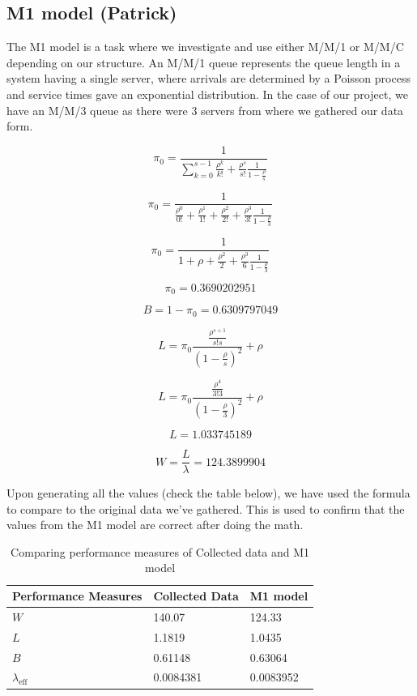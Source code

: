 \documentclass{article}
\begin{document}
\subsection{M1 model (Patrick)}

The M1 model is a task where we investigate and use either M/M/1 or M/M/C depending on our structure. An M/M/1 queue represents the queue length in a system having a single server, where arrivals are determined by a Poisson process and service times gave an exponential distribution. In the case of our project, we have an M/M/3 queue as there were 3 servers from where we gathered our data form.

$$
\pi_{0} = \frac{1}{\sum_{k=0}^{s-1}{\frac{\rho^k}{k!}} + \frac{\rho^s}{s!}\frac{1}{1-\frac{\rho}{s}}}
$$

$$
\pi_{0} = \frac{1}{\frac{\rho^0}{0!} + \frac{\rho^1}{1!} + \frac{\rho^2}{2!} + \frac{\rho^3}{3!}\frac{1}{1-\frac{\rho}{3}}}
$$

$$
\pi_{0} = \frac{1}{1 + \rho + \frac{\rho^2}{2} + \frac{\rho^3}{6}\frac{1}{1-\frac{\rho}{3}}}
$$

$$
\pi_{0} = 0.3690202951
$$

$$
B = 1-\pi_{0} = 0.6309797049
$$

$$
L = \pi_{0}\frac{\frac{\rho^{s+1}}{s!s}}{(1-\frac{\rho}{s})^2}+\rho
$$

$$
L = \pi_{0}\frac{\frac{\rho^{4}}{3!3}}{(1-\frac{\rho}{3})^2}+\rho
$$

$$
L = 1.033745189
$$

$$
W = \frac{L}{\lambda} = 124.3899904
$$



Upon generating all the values (check the table below), we have used the formula to compare to the original data we’ve gathered. This is used to confirm that the values from the M1 model are correct after doing the math.

\begin{table}[h!]
    \centering
    \caption{Comparing performance measures of Collected data and M1 model}
    \begin{tabu}{*{3}{X[c]}}
        \toprule
        \textbf{Performance Measures} & \textbf{Collected Data} & \textbf{M1 model}\\
        \midrule
        $W$ & 140.07 & 124.33\\
        $L$ & 1.1819 & 1.0435\\
        $B$ & 0.61148 & 0.63064\\
        $\lambda_{\text{eff}}$ & 0.0084381 & 0.0083952\\
        \bottomrule
    \end{tabu}
    \label{tab:M1}
\end{table}
\end{document}
